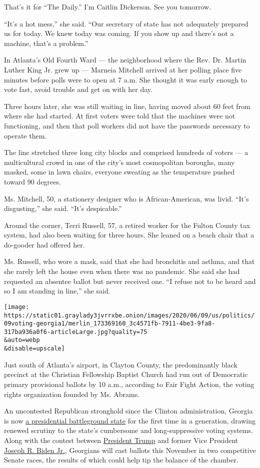 That's it for ``The Daily.'' I'm Caitlin Dickerson. See you tomorrow.

``It's a hot mess,'' she said. ``Our secretary of state has not
adequately prepared us for today. We knew today was coming. If you show
up and there's not a machine, that's a problem.''

In Atlanta's Old Fourth Ward --- the neighborhood where the Rev. Dr.
Martin Luther King Jr. grew up --- Marneia Mitchell arrived at her
polling place five minutes before polls were to open at 7 a.m. She
thought it was early enough to vote fast, avoid trouble and get on with
her day.

Three hours later, she was still waiting in line, having moved about 60
feet from where she had started. At first voters were told that the
machines were not functioning, and then that poll workers did not have
the passwords necessary to operate them.

The line stretched three long city blocks and comprised hundreds of
voters --- a multicultural crowd in one of the city's most cosmopolitan
boroughs, many masked, some in lawn chairs, everyone sweating as the
temperature pushed toward 90 degrees.

Ms. Mitchell, 50, a stationery designer who is African-American, was
livid. ``It's disgusting,'' she said. ``It's despicable.''

Around the corner, Terri Russell, 57, a retired worker for the Fulton
County tax system, had also been waiting for three hours. She leaned on
a beach chair that a do-gooder had offered her.

Ms. Russell, who wore a mask, said that she had bronchitis and asthma,
and that she rarely left the house even when there was no pandemic. She
said she had requested an absentee ballot but never received one. ``I
refuse not to be heard and so I am standing in line,'' she said.

\texttt{[image: https://static01.graylady3jvrrxbe.onion/images/2020/06/09/us/politics/09voting-georgia1/merlin\_173369160\_3c4571fb-7911-4be3-9fa8-317ba936a0f6-articleLarge.jpg?quality=75\\\&auto=webp\\\&disable=upscale]}

Just south of Atlanta's airport, in Clayton County, the predominantly
black precinct at the Christian Fellowship Baptist Church had run out of
Democratic primary provisional ballots by 10 a.m., according to Fair
Fight Action, the voting rights organization founded by Ms. Abrams.

An uncontested Republican stronghold since the Clinton administration,
Georgia is now
\href{https://www.nytimes3xbfgragh.onion/2020/06/09/us/politics/georgia-primary-election-senate-race-jon-ossoff.html}{a
presidential battleground state} for the first time in a generation,
drawing renewed scrutiny to the state's cumbersome and long-suppressive
voting systems. Along with the contest between
\href{https://www.nytimes3xbfgragh.onion/interactive/2020/us/elections/donald-trump.html}{President
Trump} and former Vice President
\href{https://www.nytimes3xbfgragh.onion/interactive/2020/us/elections/joe-biden.html}{Joseph
R. Biden Jr.}, Georgians will cast ballots this November in two
competitive Senate races, the results of which could help tip the
balance of the chamber.

